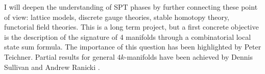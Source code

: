 I will deepen the understanding of SPT phases by further connecting these point of view: lattice models, discrete gauge theories, stable homotopy theory, functorial field theories.
This is a long term project, but a first concrete objective is the description of the signature of 4 manifolds through a combinatorial local state sum formula.
The importance of this question has been highlighted by Peter Teichner.
Partial results for general $4k$-manifolds have been achieved by Dennis Sullivan and Andrew Ranicki \cite{sullivan1976signature}.